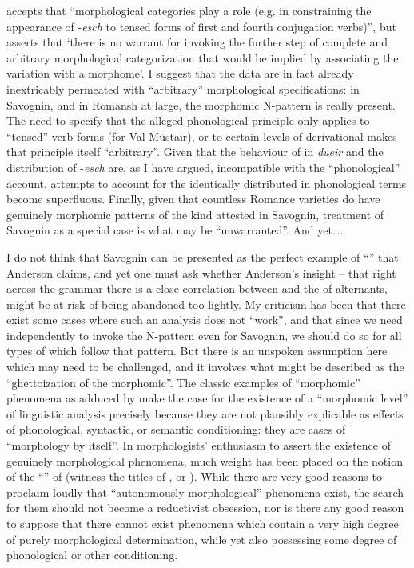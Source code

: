 \documentclass[output=paper,
modfonts
]{LSP/langsci}
\begin{document}
\citet[23]{anderson2013stem} accepts that ``morphological categories play a role
(e.g. in constraining the appearance of -\emph{esch} to tensed forms of
first and fourth conjugation verbs)'', but asserts that `there is no
warrant for invoking the further step of complete and arbitrary
morphological categorization that would be implied by associating the
variation with a morphome'. I suggest that the data are in fact already
inextricably permeated with ``arbitrary'' morphological specifications: in
Savognin, and in Romansh at large, the morphomic N-pattern is really
present. The need to specify that the alleged phonological principle
only applies to ``tensed'' verb forms (for Val Müstair), or to certain
levels of derivational  makes that principle itself
``arbitrary''. Given that the behaviour of  in \emph{dueir} and
the distribution of -\emph{esch} are, as I have argued, incompatible
with the ``phonological'' account, attempts to account for the identically
distributed  in phonological terms become
superfluous. Finally, given that countless Romance varieties do have
genuinely morphomic patterns of the kind attested in Savognin, treatment
of Savognin as a special case is what may be ``unwarranted''. And
yet\ldots{}.

I do not think that Savognin can be presented as the perfect example of
``'' that Anderson claims, and yet
one must ask whether Anderson's insight -- that right across the grammar
there is a close correlation between  and the  of
alternants, might be at risk of being abandoned too lightly. My
criticism has been that there exist some cases where such an analysis
does not ``work'', and that since we need independently to invoke the
N-pattern even for Savognin, we should do so for all types of
 which follow that pattern. But there is an unspoken
assumption here which may need to be challenged, and it involves what
might be described as the ``ghettoization of the morphomic''. The classic
examples of ``morphomic'' phenomena as adduced by \citet{Aronoff94:book} make the
case for the existence of a ``morphomic level'' of linguistic analysis
precisely because they are not plausibly explicable as effects of
phonological, syntactic, or semantic conditioning: they are cases of
``morphology by itself''. In morphologists' enthusiasm to assert the
existence of genuinely morphological phenomena, much weight has been
placed on the notion of the ``'' of  (witness the titles
of \citealt{maiden2005}, or \citealt{maiden2011}). While there are very good
reasons to proclaim loudly that ``autonomously morphological'' phenomena
exist, the search for them should not become a reductivist obsession,
nor is there any good reason to suppose that there cannot exist
phenomena which contain a very high degree of purely morphological
determination, while yet also possessing some degree of phonological or
other conditioning.
\end{document}
